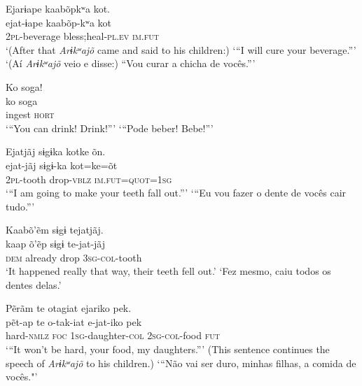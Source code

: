 \documentclass[output=paper,
modfonts,nonflat
]{langsci/langscibook}
\begin{document}
\ea Ejarɨape kaabõpkʷa{\footnotemark} kot.\\[.3em]
\gll ejat-ɨape	 kaabõp-kʷa kot\\
     \textsc{2pl}-beverage bless;heal-\textsc{pl.ev} \textsc{im.fut}\\
\glt ‘(After that \textit{Arɨkʷajõ} came and said to his children:) ‘“I will cure your beverage.”’
\glt ‘(Aí \textit{Arɨkʷajõ} veio e disse:) “Vou curar a chicha de vocês.”'
\z 

\ea Ko soga!\\[.3em]
\gll ko soga\\
     ingest \textsc{hort}\\
\glt ‘“You can drink! Drink!”’
\glt ‘“Pode beber! Bebe!”'
\z 

\ea Ejatjãj sɨgɨka kotke{\footnotemark} õn.\\[.3em]
\gll ejat-jãj sɨgɨ-ka kot=ke=õt\\
     \textsc{2pl}-tooth drop-\textsc{vblz} \textsc{im.fut}=\textsc{quot}=\textsc{1sg}\\
\glt ‘“I am going to make your teeth fall out.”’
\glt ‘“Eu vou fazer o dente de vocês cair tudo.”'
\z 

  
\ea Kaabõ'ẽm sɨgɨ tejatjãj.\\[.3em]
\gll kaap õ'ẽp sɨgɨ te-jat-jãj\\
     \textsc{dem} already drop \textsc{3sg-col}-tooth\\
\glt ‘It happened really that way, their teeth fell out.’
\glt ‘Fez mesmo, caiu todos os dentes delas.'
\z  

\ea Pẽrãm te otagiat ejariko pek.\\[.3em]
\gll pẽt-ap te o-tak-iat e-jat-iko pek\\
     hard-\textsc{nmlz} \textsc{foc} \textsc{1sg}-daughter-\textsc{col} \textsc{2sg}-\textsc{col}-food \textsc{fut}\\
\glt ‘“It won't be hard, your food, my daughters.”’ (This sentence continues the speech of \textit{Arɨkʷajõ} to his children.)
\glt ‘“Não vai ser duro, minhas filhas, a comida de vocês."'
\z 
\end{document}
